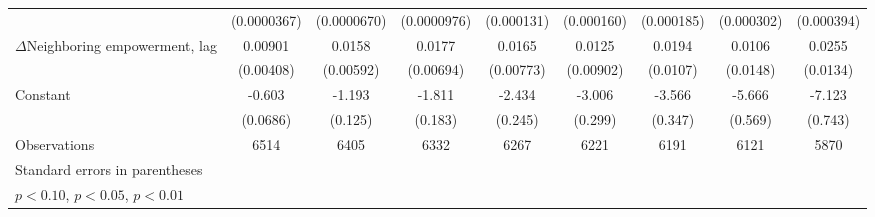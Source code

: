 \begin{table}[htbp]
\begin{tabular}{l*{8}{c}}
                    & (0.0000367)         & (0.0000670)         & (0.0000976)         &  (0.000131)         &  (0.000160)         &  (0.000185)         &  (0.000302)         &  (0.000394)         \\
[1em]
$\Delta$Neighboring  empowerment, lag&     0.00901\sym{**} &      0.0158\sym{***}&      0.0177\sym{**} &      0.0165\sym{**} &      0.0125         &      0.0194\sym{*}  &      0.0106         &      0.0255\sym{*}  \\
                    &   (0.00408)         &   (0.00592)         &   (0.00694)         &   (0.00773)         &   (0.00902)         &    (0.0107)         &    (0.0148)         &    (0.0134)         \\
[1em]
Constant            &      -0.603\sym{***}&      -1.193\sym{***}&      -1.811\sym{***}&      -2.434\sym{***}&      -3.006\sym{***}&      -3.566\sym{***}&      -5.666\sym{***}&      -7.123\sym{***}\\
                    &    (0.0686)         &     (0.125)         &     (0.183)         &     (0.245)         &     (0.299)         &     (0.347)         &     (0.569)         &     (0.743)         \\
\hline
Observations        &        6514         &        6405         &        6332         &        6267         &        6221         &        6191         &        6121         &        5870         \\
\hline\hline
\multicolumn{9}{l}{\footnotesize Standard errors in parentheses}\\
\multicolumn{9}{l}{\footnotesize \sym{*} \(p<0.10\), \sym{**} \(p<0.05\), \sym{***} \(p<0.01\)}\\
\end{tabular}
\end{table}

